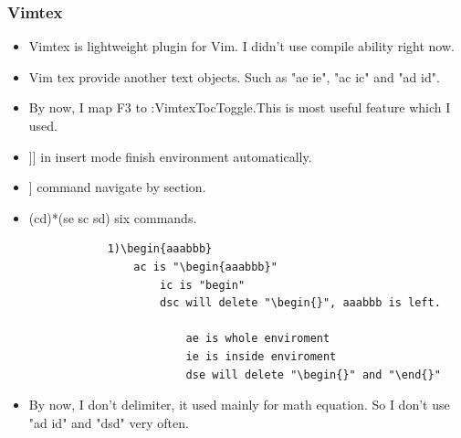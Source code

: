 \documentclass[paper=8.5in:11in, twoside, 12pt, pagesize=pdftex]{book}
\begin{document}
	\subsubsection{Vimtex}
	\begin{itemize}
		\item Vimtex is lightweight plugin for Vim. I didn't use compile ability right now. 
		
		\item Vim tex provide another text objects. Such as "ae ie", "ac ic" and "ad id". 
		
		\item By now, I map F3 to :VimtexTocToggle.This is most useful feature which I used. 
		
		\item ]] in insert mode finish environment automatically.
		
		\item [[ ]] command navigate by section.
		
		\item (cd)*(se sc sd) six commands. 
		\begin{verbatim}
			1)\begin{aaabbb}
				ac is "\begin{aaabbb}"
					ic is "begin"
					dsc will delete "\begin{}", aaabbb is left.
						
						ae is whole enviroment
						ie is inside enviroment
						dse will delete "\begin{}" and "\end{}" 
					\end{verbatim}
					\item By now, I don't delimiter, it used mainly for math equation. So I don't use "ad id" and "dsd" very often. 
				\end{itemize}
				
\end{document}
